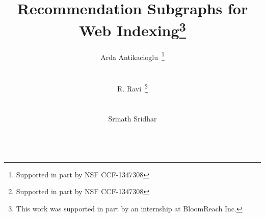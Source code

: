 \documentclass{sig-alternate}
\begin{document}
\sloppy
\title{Recommendation Subgraphs for Web Indexing\thanks{This work was supported in part by an internship at BloomReach Inc.}}

\author{
\alignauthor
Arda Antikacioglu~\thanks{Supported in part by NSF CCF-1347308} \\
       \\
       \\
\alignauthor
R. Ravi~\thanks{Supported in part by NSF CCF-1347308}  \\
       \\
       \\
\alignauthor
Srinath Sridhar \\
       \\
}

\maketitle

\setcounter{page}{1}










\setcounter{page}{1}
{}

\end{document}
